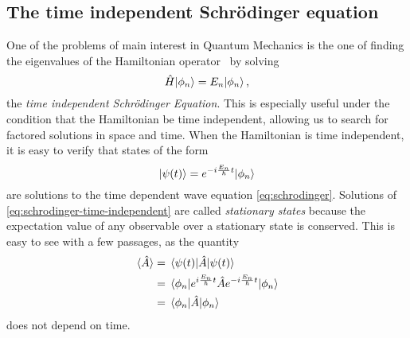         \subsection{The time independent Schr\"odinger equation}
            One of the problems of main interest in Quantum Mechanics is the one of finding the eigenvalues of the Hamiltonian operator \hH\ by solving 
            \begin{equation}
                \label{eq:schrodinger-time-independent}
                \hat{H}\!\ket{\phi_n} = E_n\!\ket{\phi_n}
                \text{,}
            \end{equation}
            the \emph{time independent Schr\"odinger Equation}.
            This is especially useful under the condition that the Hamiltonian be time independent, allowing us to search for factored solutions in space and time. When the Hamiltonian is time independent, it is easy to verify that states of the form
            \begin{equation*}
                \ket{\psi\pqty{t}} = \myexp{-i\frac{E_n}{\hbar}t}\!\ket{\phi_n}
            \end{equation*}
            are solutions to the time dependent wave equation \eqref{eq:schrodinger}. Solutions of \eqref{eq:schrodinger-time-independent} are called \emph{stationary states} because the expectation value of any observable over a stationary state is conserved. This is easy to see with a few passages, as the quantity
            \begin{align*}
                \ev*{\hA}
                &= \ev{\hA}{\psi\pqty{t}} \\
                &= \ev{\myexp{i\frac{E_n}{\hbar}t}\hA\myexp{-i\frac{E_n}{\hbar}t}}{\phi_n} \\
                &= \ev{\hA}{\phi_n}
            \end{align*}
            does not depend on time.

